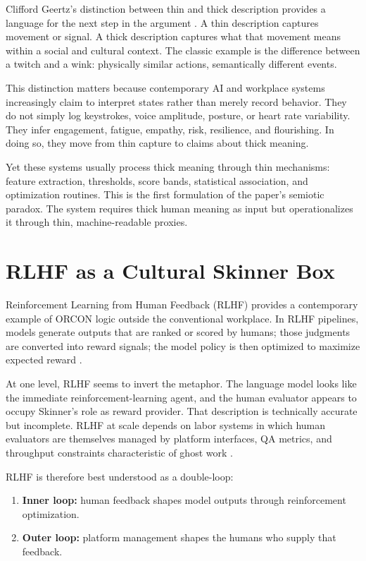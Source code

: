 \documentclass[11pt, a4paper]{article}
\begin{document}
Clifford Geertz's distinction between thin and thick description provides a language for the next step in the argument \cite{geertz1973interpretation}. A thin description captures movement or signal. A thick description captures what that movement means within a social and cultural context. The classic example is the difference between a twitch and a wink: physically similar actions, semantically different events.

This distinction matters because contemporary AI and workplace systems increasingly claim to interpret states rather than merely record behavior. They do not simply log keystrokes, voice amplitude, posture, or heart rate variability. They infer engagement, fatigue, empathy, risk, resilience, and flourishing. In doing so, they move from thin capture to claims about thick meaning.

Yet these systems usually process thick meaning through thin mechanisms: feature extraction, thresholds, score bands, statistical association, and optimization routines. This is the first formulation of the paper's semiotic paradox. The system requires thick human meaning as input but operationalizes it through thin, machine-readable proxies.

\section{RLHF as a Cultural Skinner Box}

Reinforcement Learning from Human Feedback (RLHF) provides a contemporary example of ORCON logic outside the conventional workplace. In RLHF pipelines, models generate outputs that are ranked or scored by humans; those judgments are converted into reward signals; the model policy is then optimized to maximize expected reward \cite{christiano2017preferences,ouyang2022training,sutton2018reinforcement}.

At one level, RLHF seems to invert the metaphor. The language model looks like the immediate reinforcement-learning agent, and the human evaluator appears to occupy Skinner's role as reward provider. That description is technically accurate but incomplete. RLHF at scale depends on labor systems in which human evaluators are themselves managed by platform interfaces, QA metrics, and throughput constraints characteristic of ghost work \cite{gray2019ghost,kellogg2020algorithms,perrigo2023time}.

RLHF is therefore best understood as a double-loop:

\begin{enumerate}[leftmargin=1.5em]
    \item \textbf{Inner loop:} human feedback shapes model outputs through reinforcement optimization.
    \item \textbf{Outer loop:} platform management shapes the humans who supply that feedback.
\end{enumerate}
\end{document}
